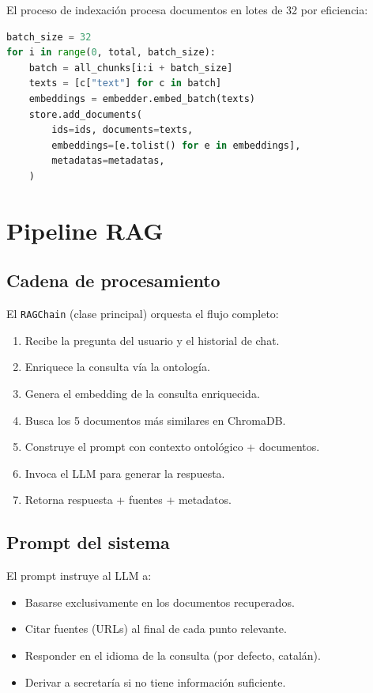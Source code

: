 \documentclass[12pt, a4paper, twoside]{report}
\begin{document}
El proceso de indexaci\'on procesa documentos en lotes de 32 por eficiencia:

\begin{lstlisting}[language=Python, caption={Indexaci\'on en batch}, label={lst:indexacion}]
batch_size = 32
for i in range(0, total, batch_size):
    batch = all_chunks[i:i + batch_size]
    texts = [c["text"] for c in batch]
    embeddings = embedder.embed_batch(texts)
    store.add_documents(
        ids=ids, documents=texts,
        embeddings=[e.tolist() for e in embeddings],
        metadatas=metadatas,
    )
\end{lstlisting}

\section{Pipeline RAG}

\subsection{Cadena de procesamiento}

El \texttt{RAGChain} (clase principal) orquesta el flujo completo:

\begin{enumerate}
  \item Recibe la pregunta del usuario y el historial de chat.
  \item Enriquece la consulta v\'ia la ontolog\'ia.
  \item Genera el embedding de la consulta enriquecida.
  \item Busca los 5 documentos m\'as similares en ChromaDB.
  \item Construye el prompt con contexto ontol\'ogico + documentos.
  \item Invoca el LLM para generar la respuesta.
  \item Retorna respuesta + fuentes + metadatos.
\end{enumerate}

\subsection{Prompt del sistema}

El prompt instruye al LLM a:

\begin{itemize}
  \item Basarse exclusivamente en los documentos recuperados.
  \item Citar fuentes (URLs) al final de cada punto relevante.
  \item Responder en el idioma de la consulta (por defecto, catal\'an).
  \item Derivar a secretar\'ia si no tiene informaci\'on suficiente.
\end{itemize}
\end{document}
